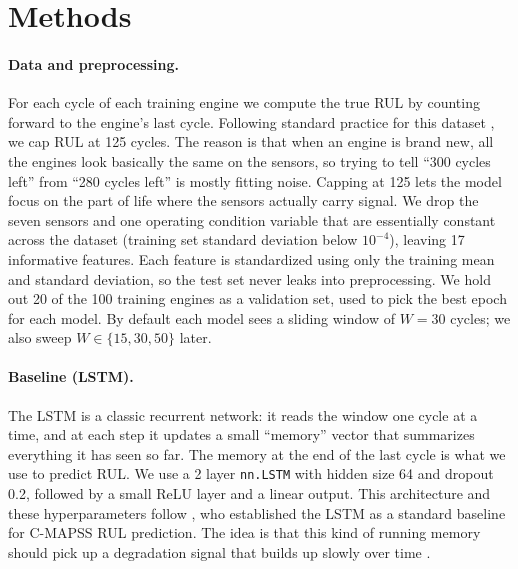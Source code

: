 \documentclass{article}
\begin{document}
\section{Methods}

\paragraph{Data and preprocessing.} For each cycle of each training engine we compute the true RUL by counting forward to the engine's last cycle. Following standard practice for this dataset \citep{zheng2017lstm}, we cap RUL at 125 cycles. The reason is that when an engine is brand new, all the engines look basically the same on the sensors, so trying to tell ``300 cycles left'' from ``280 cycles left'' is mostly fitting noise. Capping at 125 lets the model focus on the part of life where the sensors actually carry signal. We drop the seven sensors and one operating condition variable that are essentially constant across the dataset (training set standard deviation below $10^{-4}$), leaving 17 informative features. Each feature is standardized using only the training mean and standard deviation, so the test set never leaks into preprocessing. We hold out 20 of the 100 training engines as a validation set, used to pick the best epoch for each model. By default each model sees a sliding window of $W{=}30$ cycles; we also sweep $W \in \{15, 30, 50\}$ later.

\paragraph{Baseline (LSTM).} The LSTM is a classic recurrent network: it reads the window one cycle at a time, and at each step it updates a small ``memory'' vector that summarizes everything it has seen so far. The memory at the end of the last cycle is what we use to predict RUL. We use a 2 layer \texttt{nn.LSTM} with hidden size 64 and dropout 0.2, followed by a small ReLU layer and a linear output. This architecture and these hyperparameters follow \citet{zheng2017lstm}, who established the LSTM as a standard baseline for C-MAPSS RUL prediction. The idea is that this kind of running memory should pick up a degradation signal that builds up slowly over time \citep{hochreiter1997lstm}.
\end{document}
